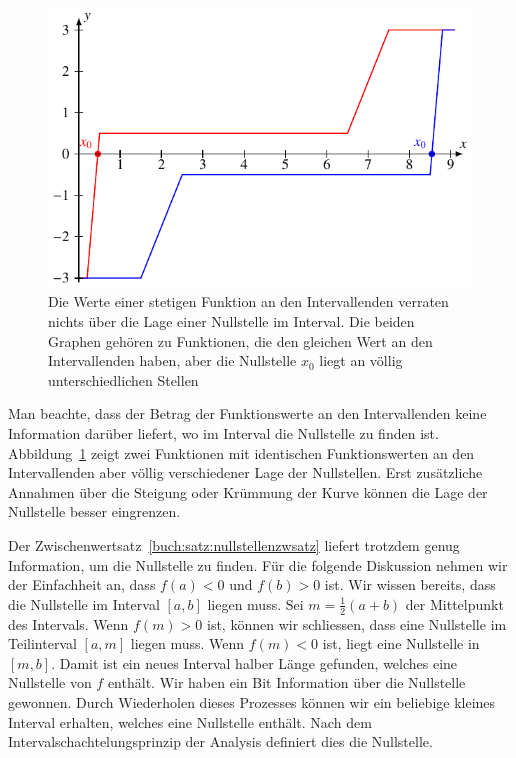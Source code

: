 \begin{figure}
\centering
\includegraphics{chapters/20-gleichungen/figures/stufe.pdf}
\caption{Die Werte einer stetigen Funktion an den Intervallenden verraten
nichts über die Lage einer Nullstelle im Interval.
Die beiden Graphen gehören zu Funktionen, die den gleichen Wert an den
Intervallenden haben, aber die Nullstelle $x_0$ liegt an völlig
unterschiedlichen Stellen
\label{buch:figure:stufe}}
\end{figure}

Man beachte, dass der Betrag der Funktionswerte an den Intervallenden keine
Information darüber liefert, wo im Interval die Nullstelle zu finden ist.
Abbildung~\ref{buch:figure:stufe} zeigt zwei Funktionen mit identischen
Funktionswerten an den Intervallenden aber völlig verschiedener Lage
der Nullstellen.
Erst zusätzliche Annahmen über die Steigung oder Krümmung der Kurve können
die Lage der Nullstelle besser eingrenzen.

Der Zwischenwertsatz~\ref{buch:satz:nullstellenzwsatz} liefert trotzdem
genug Information, um die Nullstelle zu finden.
Für die folgende Diskussion nehmen wir der Einfachheit an, dass $f(a)<0$
und $f(b)>0$ ist.
Wir wissen bereits, dass die Nullstelle im Interval $[a,b]$ liegen muss.
Sei $m=\frac12(a+b)$ der Mittelpunkt des Intervals.
Wenn $f(m) > 0$ ist, können wir schliessen, dass eine Nullstelle im
Teilinterval $[a,m]$ liegen muss.
Wenn $f(m) <0$ ist, liegt eine Nullstelle in $[m,b]$.
Damit ist ein neues Interval halber Länge gefunden, welches eine
Nullstelle von $f$ enthält.
Wir haben ein Bit Information über die Nullstelle gewonnen.
Durch Wiederholen dieses Prozesses können wir ein beliebige kleines
Interval erhalten, welches eine Nullstelle enthält.
Nach dem Intervalschachtelungsprinzip der Analysis definiert dies
die Nullstelle.

